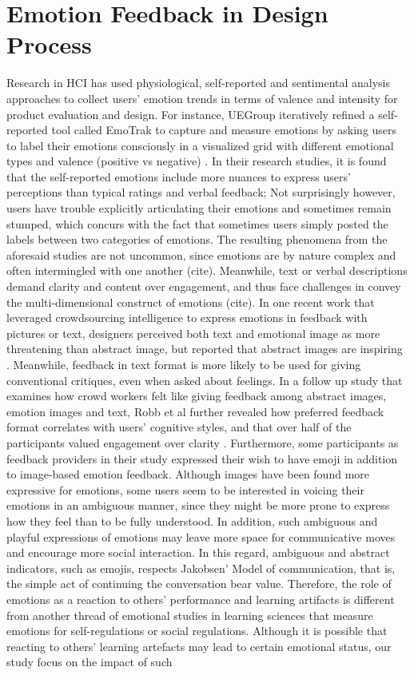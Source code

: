 \documentclass[chi_draft]{sigchi}
\begin{document}
\section{Emotion Feedback in Design Process}
Research in HCI has used physiological, self-reported and sentimental analysis approaches to collect users' emotion trends in terms of valence and intensity for product evaluation and design. For instance, UEGroup iteratively refined a self-reported tool called EmoTrak to capture and measure emotions by asking users to label their emotions consciously in a visualized grid with different emotional types and valence (positive vs negative) \cite{Garcia2016}. In their research studies, it is found that the self-reported emotions include more nuances to express users' perceptions than typical ratings and verbal feedback; Not surprisingly however, users have trouble explicitly articulating their emotions and sometimes remain stumped, which concurs with the fact that sometimes users simply posted the labels between two categories of emotions. The resulting phenomena from the aforesaid studies are not uncommon, since emotions are by nature complex and often intermingled with one another (cite). Meanwhile, text or verbal descriptions demand clarity and content over engagement, and thus face challenges in convey the multi-dimensional construct of emotions (cite). In one recent work that leveraged crowdsourcing intelligence to express emotions in feedback with pictures or text, designers perceived both text and emotional image as more threatening than abstract image, but reported that abstract images are inspiring \cite{Robb2015a}.  Meanwhile, feedback in text format is more likely to be used for giving conventional critiques, even when asked about feelings. In a follow up study that examines how crowd workers felt like giving feedback among abstract images, emotion images and text, Robb et al further revealed how preferred feedback format correlates with users' cognitive styles, and that over half of the participants valued engagement over clarity \cite{Robb2017}. Furthermore, some participants as feedback providers in their study expressed their wish to have emoji in addition to image-based emotion feedback. Although images have been found more expressive for emotions, some users seem to be interested in voicing their emotions in an ambiguous manner, since they might be more prone to express how they feel than to be fully understood. In addition, such ambiguous and playful expressions of emotions may leave more space for communicative moves and encourage more social interaction. In this regard, ambiguous and abstract indicators, such as emojis, respects Jakobsen' Model of communication, that is, the simple act of continuing the conversation bear value. Therefore, the role of emotions as a reaction to others' performance and learning artifacts is different from another thread of emotional studies in learning sciences that measure emotions for self-regulations or social regulations. Although it is possible that reacting to others' learning artefacts may lead to certain emotional status, our study focus on the impact of such 
\end{document}
